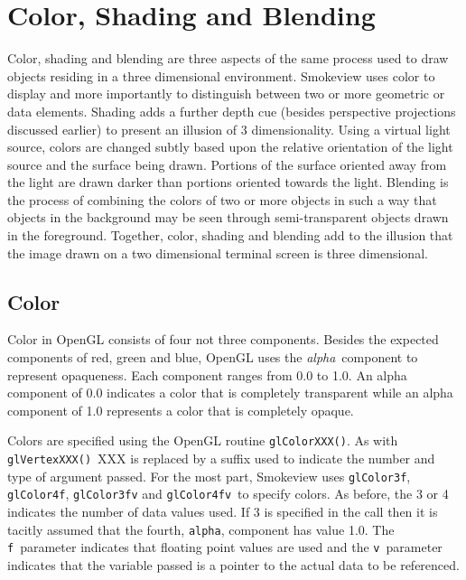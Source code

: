 \documentclass[11pt,twoside]{book}
\begin{document}
\chapter{Color, Shading and Blending}
Color, shading and blending are three aspects of the same process used to draw objects residing in a three dimensional environment.  Smokeview uses color to display and more importantly to distinguish between two or more geometric or data elements.  Shading adds a further depth cue (besides perspective projections discussed earlier) to present an illusion of 3 dimensionality.  Using a virtual light source, colors are changed subtly based upon the relative orientation of the light source and the surface being drawn.  Portions of the surface oriented away from the light are drawn darker than portions oriented towards the light.  Blending is the process of combining the colors of two or more objects in such a way that objects in the background may be seen through semi-transparent objects drawn in the foreground.  Together, color, shading and blending add to the illusion that the image drawn on a two dimensional terminal screen is three dimensional.

\section{Color}
Color
in OpenGL consists of four not three components.  Besides the expected components
of red, green and blue, OpenGL uses the {\em alpha}\ component to represent opaqueness.
Each component ranges from 0.0 to 1.0. An alpha component of
0.0 indicates a color that is completely transparent while an alpha component of 1.0
represents a color that is completely opaque.

Colors are specified using the OpenGL routine {\tt glColorXXX()}.  As with {\tt glVertexXXX()}\ XXX is replaced by a suffix used to indicate the number and type of argument passed.  For the most part, Smokeview uses {\tt glColor3f}, {\tt glColor4f}, {\tt glColor3fv} and {\tt glColor4fv}\ to specify colors.  As before, the 3 or 4 indicates the number of data values used.  If 3 is specified in the call then it is tacitly assumed that the fourth, {\tt alpha}, component has value 1.0.  The {\tt f}\ parameter indicates that floating point values are used and the {\tt v}\ parameter indicates that the variable passed is a pointer to the actual data to be referenced.
\end{document}
